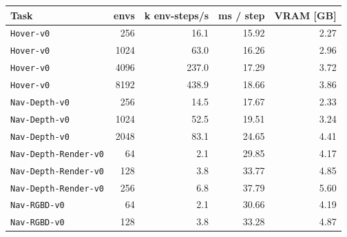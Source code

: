 \begin{tabular}{lrrrr}\toprule
Task & envs & k env-steps/s & ms / step & VRAM [GB]\\\midrule
\texttt{Hover-v0} & 256 & 16.1 & 15.92 & 2.27\\
\texttt{Hover-v0} & 1024 & 63.0 & 16.26 & 2.96\\
\texttt{Hover-v0} & 4096 & 237.0 & 17.29 & 3.72\\
\texttt{Hover-v0} & 8192 & 438.9 & 18.66 & 3.86\\
\texttt{Nav-Depth-v0} & 256 & 14.5 & 17.67 & 2.33\\
\texttt{Nav-Depth-v0} & 1024 & 52.5 & 19.51 & 3.24\\
\texttt{Nav-Depth-v0} & 2048 & 83.1 & 24.65 & 4.41\\
\texttt{Nav-Depth-Render-v0} & 64 & 2.1 & 29.85 & 4.17\\
\texttt{Nav-Depth-Render-v0} & 128 & 3.8 & 33.77 & 4.85\\
\texttt{Nav-Depth-Render-v0} & 256 & 6.8 & 37.79 & 5.60\\
\texttt{Nav-RGBD-v0} & 64 & 2.1 & 30.66 & 4.19\\
\texttt{Nav-RGBD-v0} & 128 & 3.8 & 33.28 & 4.87\\
\bottomrule\end{tabular}
